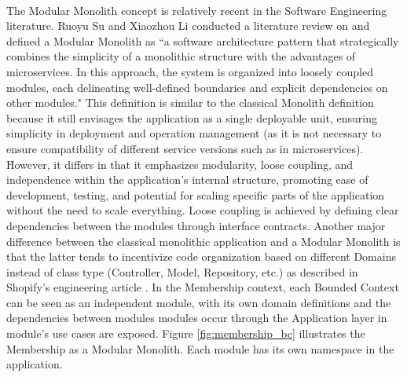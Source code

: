 \paragraph{} The Modular Monolith concept is relatively recent in the Software Engineering literature. Ruoyu Su and Xiaozhou Li conducted a literature review on \cite{su2024modular} and defined a Modular Monolith as ``a software architecture pattern that strategically combines the simplicity of a monolithic structure with the advantages of microservices. In this approach, the system is organized into loosely coupled modules, each delineating well-defined boundaries and explicit dependencies on other modules." This definition is similar to the classical Monolith definition because it still envisages the application as a single deployable unit, ensuring simplicity in deployment and operation management (as it is not necessary to ensure compatibility of different service versions such as in microservices). However, it differs in that it emphasizes modularity, loose coupling, and independence within the application's internal structure, promoting ease of development, testing, and potential for scaling specific parts of the application without the need to scale everything. Loose coupling is achieved by defining clear dependencies between the modules through interface contracts. Another major difference between the classical monolithic application and a Modular Monolith is that the latter tends to incentivize code organization based on different Domains instead of class type (Controller, Model, Repository, etc.) as described in Shopify's engineering article \cite{ShopifyModularMonoly}. In the Membership context, each Bounded Context can be seen as an independent module, with its own domain definitions and the dependencies between modules modules occur through the Application layer in module's use cases are exposed. Figure \ref{fig:membership_bc} illustrates the Membership as a Modular Monolith. Each module has its own namespace in the application.

